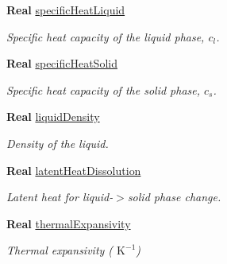 \begin{DoxyCompactItemize}
\textbf{ Real} \hyperlink{class_mushy_layer_params_ab80de1952111d2c7bd8eeb30c4388441}{specific\+Heat\+Liquid}
\begin{DoxyCompactList}\small\item\em Specific heat capacity of the liquid phase, $ c_l $. \end{DoxyCompactList}\item 
\mbox{\label{class_mushy_layer_params_ad7f89d49eb18122b9a8a6be3359ae5c1}} 
\textbf{ Real} \hyperlink{class_mushy_layer_params_ad7f89d49eb18122b9a8a6be3359ae5c1}{specific\+Heat\+Solid}
\begin{DoxyCompactList}\small\item\em Specific heat capacity of the solid phase, $c_s$. \end{DoxyCompactList}\item 
\mbox{\label{class_mushy_layer_params_add77a2b935f21ac4cf3d7fe83afac04c}} 
\textbf{ Real} \hyperlink{class_mushy_layer_params_add77a2b935f21ac4cf3d7fe83afac04c}{liquid\+Density}
\begin{DoxyCompactList}\small\item\em Density of the liquid. \end{DoxyCompactList}\item 
\mbox{\label{class_mushy_layer_params_a98ffdd6b098c0950601611df2b6c60a4}} 
\textbf{ Real} \hyperlink{class_mushy_layer_params_a98ffdd6b098c0950601611df2b6c60a4}{latent\+Heat\+Dissolution}
\begin{DoxyCompactList}\small\item\em Latent heat for liquid-\/$>$solid phase change. \end{DoxyCompactList}\item 
\mbox{\label{class_mushy_layer_params_abac32891e2e9f03ab16ce6502104db9a}} 
\textbf{ Real} \hyperlink{class_mushy_layer_params_abac32891e2e9f03ab16ce6502104db9a}{thermal\+Expansivity}
\begin{DoxyCompactList}\small\item\em Thermal expansivity ( $\mbox{K}^{-1} $) \end{DoxyCompactList}\item 
\mbox{\label{class_mushy_layer_params_a2aa5fcbb49c158c75b8728596ed25b45}} 

\end{DoxyCompactItemize}
